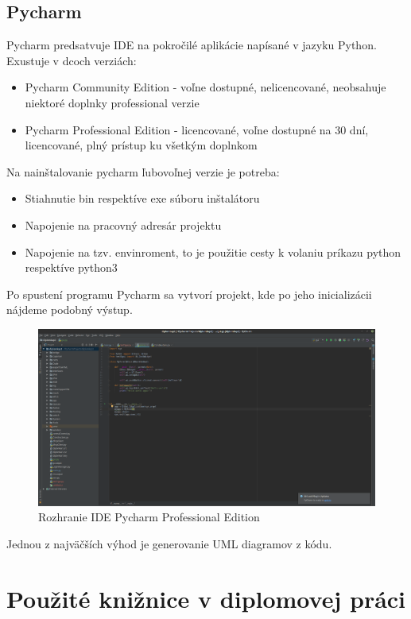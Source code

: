 \section{Pycharm}
Pycharm predsatvuje IDE na pokročilé aplikácie napísané v jazyku Python. Exustuje v dcoch verziách:\begin{itemize}
\item Pycharm Community Edition - voľne dostupné, nelicencované, neobsahuje niektoré doplnky professional verzie
\item Pycharm Professional Edition - licencované, voľne dostupné na 30 dní, licencované, plný prístup ku všetkým doplnkom
\end{itemize}
Na nainštalovanie pycharm ľubovoľnej verzie je potreba:\begin{itemize}
\item Stiahnutie bin respektíve exe súboru inštalátoru
\item Napojenie na pracovný adresár projektu
\item Napojenie na tzv. envinroment, to je použitie cesty k volaniu príkazu python respektíve python3
\end{itemize}
Po spustení programu Pycharm sa vytvorí projekt, kde po jeho inicializácii nájdeme podobný výstup.
\begin{figure}[H]
\centering
\includegraphics[scale=0.25]{../text/pycharm.png}
\caption{Rozhranie IDE Pycharm Professional Edition}
\label{fig:webfig}
\end{figure} 
Jednou z najväčších výhod je generovanie UML diagramov z kódu.
\chapter{Použité knižnice v diplomovej práci}

